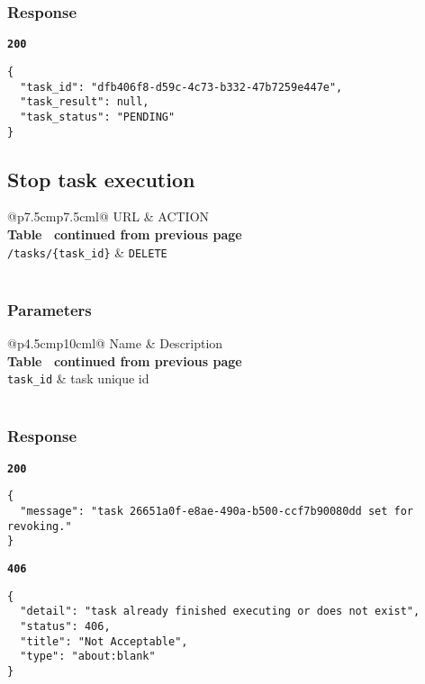 \subsubsection{Response}
\textbf{\texttt{200}}
\begin{lstlisting}
{
  "task_id": "dfb406f8-d59c-4c73-b332-47b7259e447e",
  "task_result": null,
  "task_status": "PENDING"
}
\end{lstlisting}

\subsection{Stop task execution}

\begin{longtable}[c]{@{}p{7.5cm}p{7.5cm}l@{}}
  \toprule
  URL                          & ACTION                       \\* \midrule
  \endfirsthead
  \multicolumn{3}{c}%
  {{\bfseries Table \thetable\ continued from previous page}} \\
  \endhead
  \bottomrule
  \endfoot
  \endlastfoot
  \texttt{/tasks/\{task\_id\}} & \texttt{DELETE}              \\* \bottomrule
  \label{tab:rdf-validator-delete-task}                       \\
\end{longtable}

\subsubsection{Parameters}
\begin{longtable}[c]{@{}p{4.5cm}p{10cm}l@{}}
  \toprule
  Name              & Description                             \\* \midrule
  \endfirsthead
  \multicolumn{3}{c}%
  {{\bfseries Table \thetable\ continued from previous page}} \\
  \endhead
  \bottomrule
  \endfoot
  \endlastfoot
  \texttt{task\_id} & task unique id                          \\* \bottomrule
  \label{tab:rdf-validator-delete-task-parameters}            \\
\end{longtable}

\subsubsection{Response}
\textbf{\texttt{200}}
\begin{lstlisting}
{
  "message": "task 26651a0f-e8ae-490a-b500-ccf7b90080dd set for revoking."
}
\end{lstlisting}

\textbf{\texttt{406}}
\begin{lstlisting}
{
  "detail": "task already finished executing or does not exist",
  "status": 406,
  "title": "Not Acceptable",
  "type": "about:blank"
}
\end{lstlisting}